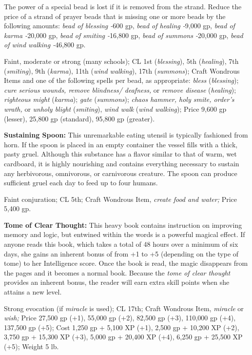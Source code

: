 \documentclass{article}
\begin{document}
The power of a special bead is lost if it is removed from the strand. Reduce the 
price of a strand of prayer beads that is missing one or more beads by the following 
amounts: \textit{bead of blessing -}600 gp, \textit{bead of healing -}9,000 gp, 
\textit{bead of karma -}20,000 gp, \textit{bead of smiting -}16,800 gp, \textit{bead 
of summons -}20,000 gp, \textit{bead of wind walking -}46,800 gp.

Faint, moderate or strong (many schools); CL 1st (\textit{blessing}), 5th (\textit{healing}), 
7th (\textit{smiting}), 9th (\textit{karma}), 11th (\textit{wind walking}), 17th 
(\textit{summons}); Craft Wondrous Items and one of the following spells per bead, 
as appropriate: \textit{bless }(\textit{blessing}); \textit{cure serious wounds, 
remove blindness/ deafness, }or \textit{remove disease }(\textit{healing}); \textit{righteous 
might }(\textit{karma}); \textit{gate }(\textit{summons}); \textit{chaos hammer, 
holy smite, order's wrath, }or \textit{unholy blight }(\textit{smiting}), \textit{wind 
walk }(\textit{wind walking}); Price 9,600 gp (lesser), 25,800 gp (standard), 95,800 
gp (greater).

\textbf{Sustaining Spoon:} This unremarkable eating utensil is typically fashioned 
from horn. If the spoon is placed in an empty container the vessel fills with a 
thick, pasty gruel. Although this substance has a flavor similar to that of warm, 
wet cardboard, it is highly nourishing and contains everything necessary to sustain 
any herbivorous, omnivorous, or carnivorous creature. The spoon can produce sufficient 
gruel each day to feed up to four humans.

Faint conjuration; CL 5th; Craft Wondrous Item, \textit{create food and water; 
}Price 5,400 gp.

\textbf{Tome of Clear Thought:} This heavy book contains instruction on improving 
memory and logic, but entwined within the words is a powerful magical effect. If 
anyone reads this book, which takes a total of 48 hours over a minimum of six days, 
she gains an inherent bonus of from +1 to +5 (depending on the type of tome) to 
her Intelligence score. Once the book is read, the magic disappears from the pages 
and it becomes a normal book. Because the \textit{tome of clear thought }provides 
an inherent bonus, the reader will earn extra skill points when she attains a new 
level.

Strong evocation (if \textit{miracle }is used); CL 17th; Craft Wondrous Item, \textit{miracle 
}or \textit{wish; }Price 27,500 gp (+1), 55,000 gp (+2), 82,500 gp (+3), 110,000 
gp (+4), 137,500 gp (+5); Cost 1,250 gp + 5,100 XP (+1), 2,500 gp + 10,200 XP (+2), 
3,750 gp + 15,300 XP (+3), 5,000 gp + 20,400 XP (+4), 6,250 gp + 25,500 XP (+5); 
Weight 5 lb.
\end{document}
